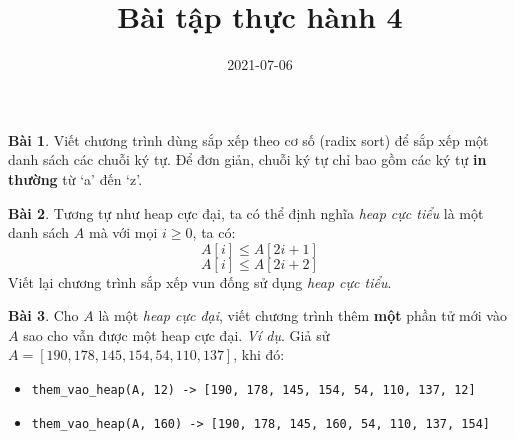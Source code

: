 \documentclass[12pt, a4paper]{article}
\title{Bài tập thực hành 4}
\date{2021-07-06}
\author{}
\begin{document}
    \onehalfspacing
    \maketitle
    \textbf{Bài 1}. Viết chương trình dùng sắp xếp theo cơ số (radix sort) để sắp xếp một danh sách các chuỗi ký tự.
    Để đơn giản, chuỗi ký tự chỉ bao gồm các ký tự \textbf{in thường} từ `a' đến `z'.

    \textbf{Bài 2}. Tương tự như heap cực đại, ta có thể định nghĩa \textit{heap cực tiểu} là 
    một danh sách $A$ mà với mọi $i \geq 0$, ta có:
    $$A[i] \leq A[2i+1]$$
    $$A[i] \leq A[2i+2]$$
    Viết lại chương trình sắp xếp vun đống sử dụng \textit{heap cực tiểu}.

    \textbf{Bài 3}. Cho $A$ là một \textit{heap cực đại}, viết chương trình thêm \textbf{một} phần tử mới vào $A$
    sao cho vẫn được một heap cực đại.
    \textit{Ví dụ}. Giả sử $A = [190, 178, 145, 154, 54, 110, 137]$, khi đó:
    \begin{itemize}
        \item \texttt{them\_vao\_heap(A, 12) -> [190, 178, 145, 154, 54, 110, 137, 12]}
        \item \texttt{them\_vao\_heap(A, 160) -> [190, 178, 145, 160, 54, 110, 137, 154]}
    \end{itemize}
\end{document}
